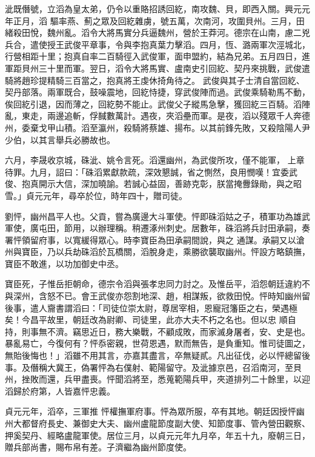\begin{pinyinscope}
 泚既僭號，立滔為皇太弟，仍令以重賂招誘回紇，南攻魏、貝，即西入關。興元元年正月，滔
 驅率燕、薊之眾及回紇雜虜，號五萬，次南河，攻圍貝州。三月，田緒殺田悅，魏州亂。滔令大將馬實分兵逼魏州，營於王莽河。德宗在山南，慮二兇兵合，遣使授王武俊平章事，令與李抱真葉力擊滔。四月，恆、潞兩軍次涇城北，行營相距十里；抱真自率二百騎徑入武俊軍，面申盟約，結為兄弟。五月四日，進軍距貝州三十里而軍。翌日，滔令大將馬實、盧南史引回紇、契丹來挑戰，武俊遣騎將趙珍提精騎三百當之，抱真將王虔休掎角待之。
 武俊與其子士清自當回紇、契丹部落。兩軍既合，鼓噪震地，回紇恃捷，穿武俊陣而過。武俊乘騎勒馬不動，俟回紇引退，因而薄之，回紇勢不能止。武俊父子縱馬急擊，獲回紇三百騎。滔陣亂，東走，兩邊追斬，俘馘數萬計。遇夜，夾滔壘而軍。是夜，滔以殘眾千人奔德州，委棄戈甲山積。滔至瀛州，殺騎將蔡雄、揚布。以其前鋒先敗，又殺陰陽人尹少伯，以其言舉兵必勝故也。



 六月，李晟收京城，硃泚、姚令言死。滔還幽州，為武俊所攻，僅不能軍，
 上章待罪。九月，詔曰：「硃滔累獻款疏，深效懇誠，省之惻然，良用憫嘆！宜委武俊、抱真開示大信，深加曉諭。若誠心益固，善跡克彰，朕當掩釁錄勛，與之昭雪。」貞元元年，尋卒於位，時年四十，贈司徒。



 劉怦，幽州昌平人也。父貢，嘗為廣邊大斗軍使。怦即硃滔姑之子，積軍功為雄武軍使，廣屯田，節用，以辦理稱。稍遷涿州刺史。居數年，硃滔將兵討田承嗣，奏署怦領留府事，以寬緩得眾心。時李寶臣為田承嗣間說，與之
 通謀。承嗣又以滄州與寶臣，乃以兵劫硃滔於瓦橋關，滔脫身走，乘勝欲襲取幽州。怦設方略鎮撫，寶臣不敢進，以功加御史中丞。



 寶臣死，子惟岳拒朝命，德宗令滔與張孝忠同力討之。及惟岳平，滔怨朝廷違約不與深州，含怒不已。會王武俊亦怨割地深、趙，相謀叛，欲救田悅。怦時知幽州留後事，遣人齎書謂滔曰：「司徒位崇太尉，尊居宰相，恩寵冠籓臣之右，榮遇極矣！今昌平故里，朝廷改為尉卿、司徒里，此亦大夫不朽之名也。但以忠
 順自持，則事無不濟。竊思近日，務大樂戰，不顧成敗，而家滅身屠者，安、史是也。暴亂易亡，今復何有？怦忝密親，世荷恩遇，默而無告，是負重知。惟司徒圖之，無貽後悔也！」滔雖不用其言，亦嘉其盡言，卒無疑貳。凡出征伐，必以怦總留後事。及僭稱大冀王，偽署怦為右僕射、範陽留守。及泚據京邑，召滔南河，至貝州，挫敗而還，兵甲盡喪。怦聞滔將至，悉蒐範陽兵甲，夾道排列二十餘里，以迎滔歸於府第，人皆嘉怦忠義。



 貞元元年，滔卒，三軍推
 怦權撫軍府事。怦為眾所服，卒有其地。朝廷因授怦幽州大都督府長史、兼御史大夫、幽州盧龍節度副大使、知節度事、管內營田觀察、押奚契丹、經略盧龍軍使。居位三月，以貞元元年九月卒，年五十九，廢朝三日，贈兵部尚書，賜布帛有差。子濟繼為幽州節度使。




\end{pinyinscope}

